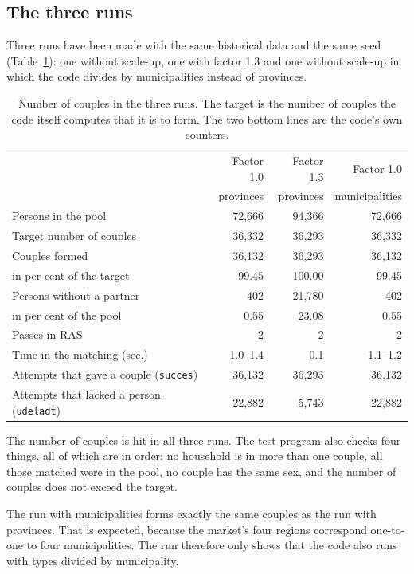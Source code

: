\documentclass[12pt,a4paper]{article}
\newcommand{\kode}[1]{\texttt{#1}}
\begin{document}
\subsection{The three runs}

Three runs have been made with the same historical data and the same seed
(Table~\ref{tab:koersler}): one without scale-up, one with factor 1.3 and one without scale-up in
which the code divides by municipalities instead of provinces.

\begin{table}[htb]
\centering
\caption{Number of couples in the three runs. The target is the number of couples the code itself
computes that it is to form. The two bottom lines are the code's own counters.}
\label{tab:koersler}
\begin{tabular}{@{}lrrr@{}}
\toprule
 & Factor 1.0 & Factor 1.3 & Factor 1.0 \\
 & provinces & provinces & municipalities \\
\midrule
Persons in the pool & 72,666 & 94,366 & 72,666 \\
Target number of couples & 36,332 & 36,293 & 36,332 \\
Couples formed & 36,132 & 36,293 & 36,132 \\
\quad in per cent of the target & 99.45 & 100.00 & 99.45 \\
Persons without a partner & 402 & 21,780 & 402 \\
\quad in per cent of the pool & 0.55 & 23.08 & 0.55 \\
Passes in RAS & 2 & 2 & 2 \\
Time in the matching (sec.) & 1.0--1.4 & 0.1 & 1.1--1.2 \\
\midrule
Attempts that gave a couple (\kode{succes}) & 36,132 & 36,293 & 36,132 \\
Attempts that lacked a person (\kode{udeladt}) & 22,882 & 5,743 & 22,882 \\
\bottomrule
\end{tabular}
\end{table}

The number of couples is hit in all three runs. The test program also checks four things, all of
which are in order: no household is in more than one couple, all those matched were in the pool, no
couple has the same sex, and the number of couples does not exceed the target.

The run with municipalities forms exactly the same couples as the run with provinces. That is
expected, because the market's four regions correspond one-to-one to four municipalities. The run
therefore only shows that the code also runs with types divided by municipality.
\end{document}
